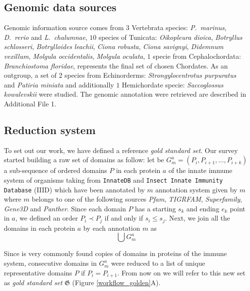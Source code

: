 \documentclass[11pt]{article}
\begin{document}
\subsection*{Genomic data sources}

Genomic information source comes from $3$ Vertebrata species:
\textit{P.\ marinus}, \textit{D.\ rerio} and \textit{L.\ chalumnae}, $10$
species of Tunicata: \textit{Oikopleura dioica}, \textit{Botryllus schlosseri}, 
\textit{Botrylloides leachii}, \textit{Ciona robusta}, \textit{Ciona savignyi}, 
\textit{Didemnum vexillum}, \textit{Molgula occidentalis}, \textit{Molgula 
oculata}, $1$ specie from Cephalochordata: \textit{Branchiostoma floridae}, 
represents the final set of chosen Chordates. As an outgroup, a set of 
$2$ species from Echinorderms: \textit{Strongylocentrotus purpuratus} and 
\textit{Patiria miniata} and additionally $1$ Hemichordate 
specie: \textit{Saccoglossus kowalevskii} were studied. The genomic 
annotation were retrieved are described in Additional File 1. 

\subsection*{Reduction system} \label{reduction}
To set out our work, we have defined a reference \textsl{gold standard set}. 
Our survey started building a raw set of domains as follow: let be $G^{a}_{m} = 
(P_i,P_{i+1},\ldots,P_{i+k})$ a sub-sequence of ordered domains $P$ in each 
protein $a$ of the innate immune system of organisms taking from 
\texttt{InnateDB} and \texttt{Insect Innate Immunity Database} (IIID) which have 
been annotated by $m$ annotation system given by $m$ where $m$ belongs to one of 
the following sources \textsl{Pfam}, \textsl{TIGRFAM}, \textsl{Superfamily}, 
\textsl{Gene3D} and \textsl{Panther}. Since each domain $P$ has a starting $s_k$ 
and ending $e_k$ point in $a$, we defined an order $P_i \prec P_j$ if and only 
if $s_i \le s_j$. Next, we join all the domains in each protein $a$ by each 
annotation $m$ as \[\bigcup G^{a}_{m}\]

Since is very commonly found copies of domains in proteins of the immune 
system, consecutive domains in $G^{a}_{m}$ were reduced to a list of unique 
representative domains $P$ if $P_i = P_{i+1}$. From now on we will refer to this 
new set as \textsl{gold standard set} $\boldsymbol{\mathfrak{G}}$ (Figure 
\ref{workflow_golden}A).
\end{document}

